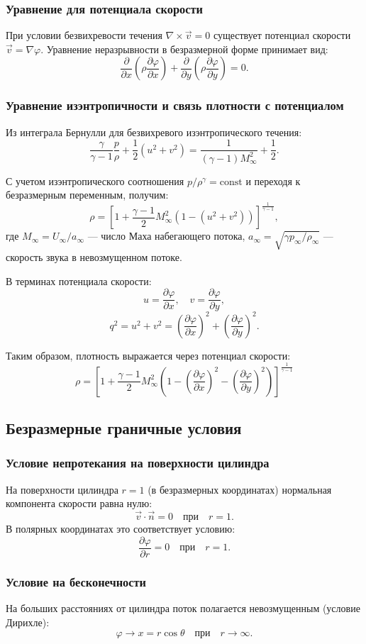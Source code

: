 	\subsubsection{Уравнение для потенциала скорости}
	При условии безвихревости течения $\nabla \times \vec{v} = 0$ существует потенциал скорости $\vec{v} = \nabla \varphi$. Уравнение неразрывности в безразмерной форме принимает вид:
	\[
	\frac{\partial}{\partial x} \left( \rho \frac{\partial \varphi}{\partial x} \right) + \frac{\partial}{\partial y} \left( \rho \frac{\partial \varphi}{\partial y} \right) = 0.
	\]
	
	\subsubsection{Уравнение изэнтропичности и связь плотности с потенциалом}
	
	Из интеграла Бернулли для безвихревого изэнтропического течения:
	\[
	\frac{\gamma}{\gamma-1} \frac{p}{\rho} + \frac{1}{2} (u^2 + v^2) = \frac{1}{(\gamma-1)M^2_\infty} + \frac{1}{2}.
	\]
	
	С учетом изэнтропического соотношения $p / \rho^\gamma = \text{const}$ и переходя к безразмерным переменным, получим:
	\[
	\rho = \left[ 1 + \frac{\gamma-1}{2} M_\infty^2 \left( 1 - (u^2 + v^2) \right) \right]^{\frac{1}{\gamma-1}},
	\]
	где $M_\infty = U_\infty / a_\infty$ — число Маха набегающего потока, $a_\infty = \sqrt{\gamma p_\infty / \rho_\infty}$ — скорость звука в невозмущенном потоке.
	
	В терминах потенциала скорости:
	\[
	u = \frac{\partial \varphi}{\partial x}, \quad v = \frac{\partial \varphi}{\partial y},
	\]
	\[
	q^2 = u^2 + v^2 = \left( \frac{\partial \varphi}{\partial x} \right)^2 + \left( \frac{\partial \varphi}{\partial y} \right)^2.
	\]
	
	Таким образом, плотность выражается через потенциал скорости:
	\begin{equation}
		\boxed{\rho = \left[ 1 + \frac{\gamma-1}{2} M_\infty^2 \left( 1 - \left( \frac{\partial \varphi}{\partial x} \right)^2 - \left( \frac{\partial \varphi}{\partial y} \right)^2 \right) \right]^{\frac{1}{\gamma-1}}}
		\label{eq:density}
	\end{equation}
	
	\subsection{Безразмерные граничные условия}
	
	\subsubsection{Условие непротекания на поверхности цилиндра}
	На поверхности цилиндра $r = 1$ (в безразмерных координатах) нормальная компонента скорости равна нулю:
	\[
	\vec{v} \cdot \vec{n} = 0 \quad \text{при} \quad r = 1.
	\]
	В полярных координатах это соответствует условию:
	\[
	\frac{\partial \varphi}{\partial r} = 0 \quad \text{при} \quad r = 1.
	\]
	
	\subsubsection{Условие на бесконечности}
	На больших расстояниях от цилиндра поток полагается невозмущенным (условие Дирихле):
	\[
	\varphi \to x = r \cos \theta \quad \text{при} \quad r \to \infty.
	\]
	
	
	
